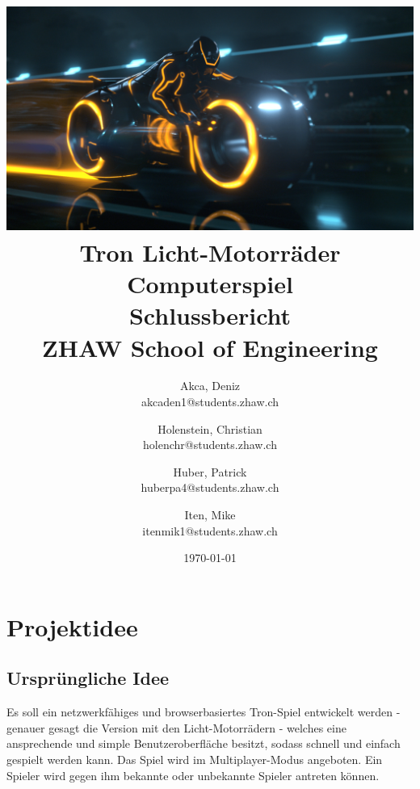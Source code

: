 \documentclass[11pt,ngerman]{article}
\begin{document}
    \title{\includegraphics[width=1\textwidth]{figures/Tron-Legacy_Bike.png}\\ Tron Licht-Motorräder Computerspiel\\
        \vspace{1cm}
        \smaller{}Schlussbericht \\
        \vspace{0.5cm}
        \small{}ZHAW  School of Engineering
        \vspace{1.5cm}
    }
    \author{
        Akca, Deniz\\
        \small{akcaden1@students.zhaw.ch}
        \and
        Holenstein, Christian\\
        \small{holenchr@students.zhaw.ch}
        \and
        Huber, Patrick\\
        \small{huberpa4@students.zhaw.ch}
        \and
        Iten, Mike\\
        \small{itenmik1@students.zhaw.ch}
        \vspace{1.5cm}
    }
   \date{\today}

    \maketitle
    \newpage

    \tableofcontents
    \newpage

    \section{Projektidee}

    \subsection{Ursprüngliche Idee}
    Es soll ein netzwerkfähiges und browserbasiertes Tron-Spiel entwickelt werden - genauer gesagt die Version mit den  Licht-Motorrädern - welches eine ansprechende und simple Benutzeroberfläche besitzt, sodass schnell und einfach gespielt werden kann. Das Spiel wird im \Gls{Multiplayer}-Modus angeboten. Ein Spieler wird gegen ihm bekannte oder unbekannte Spieler antreten können.
\end{document}
